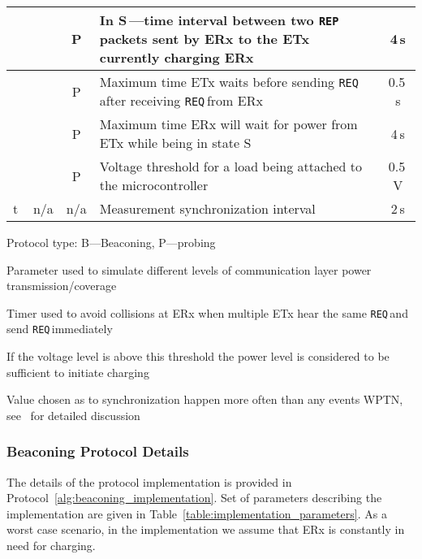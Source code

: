 \documentclass[11pt,draftclsnofoot,journal,onecolumn]{IEEEtran}
\newcommand{\textsubscript}[1]{}
\newcommand{\rxStateWaiting}{\textsf{S\textsubscript{WAIT}}\,}
\newcommand{\rxStateCharged}{\textsf{S\textsubscript{CHARGED}}\,}
\newcommand{\txRandomWaitTimeMax}{}
\newcommand{\rxDelayWaitingForPower}{}
\newcommand{\rxDelayPowerProbing}{}
\newcommand{\rxVoltageThreshold}{}
\newcommand{\chargingRequest}{\texttt{REQ\textsubscript{CRG}}\,}
\newcommand{\powerProbeReport}{\texttt{REP\textsubscript{PWR}}\,}
\newcommand{\powerProbeRequest}{\texttt{REQ\textsubscript{PWR}}\,}
\newcommand{\tSyn}{t\textsubscript{SYN}\,}
\begin{document}
\begin{table*}
\begin{threeparttable}
\begin{center}
\begin{tabular}{| l | c c | l | c}
\hline
\rxDelayPowerProbing & & P & In \rxStateCharged---time interval between two \powerProbeReport packets sent by ERx to the ETx currently charging ERx & 4\,s\\
\hline
\txRandomWaitTimeMax & & P & Maximum time ETx waits before sending \powerProbeRequest after receiving \chargingRequest from ERx\tnote{c}& 0.5\,s\\
\hline
\rxDelayWaitingForPower & & P & Maximum time ERx will wait for power from ETx while being in state \rxStateWaiting & 4\,s\\
\hline
\rxVoltageThreshold & & P & Voltage threshold for a load being attached to the microcontroller\tnote{d} & 0.5\,V\\
\hline
\tSyn & n/a & n/a & Measurement synchronization interval\tnote{e} & 2\,s\\
\hline
\end{tabular}

\begin{tablenotes}
\item[a] Protocol type: B---Beaconing, P---probing
\item[b] Parameter used to simulate different levels of communication layer power transmission/coverage
\item[c] Timer used to avoid collisions at ERx when multiple ETx hear the same \chargingRequest and send \powerProbeRequest immediately
\item[d] If the voltage level is above this threshold the power level is considered to be sufficient to initiate charging
\item[e] Value chosen as to synchronization happen more often than any events WPTN, see~\cite[Sec. 5.2]{golinski_msc_2015} for detailed discussion
\end{tablenotes}
\end{center}
\label{table:implementation_parameters}
\end{threeparttable}
\end{table*}

\subsubsection{Beaconing Protocol Details}
\label{subsubsec:beaconing_based_protocol}

The details of the protocol implementation is provided in Protocol~\ref{alg:beaconing_implementation}. Set of parameters describing the implementation are given in Table~\ref{table:implementation_parameters}. As a worst case scenario, in the implementation we assume that ERx is constantly in need for charging.
\end{document}

